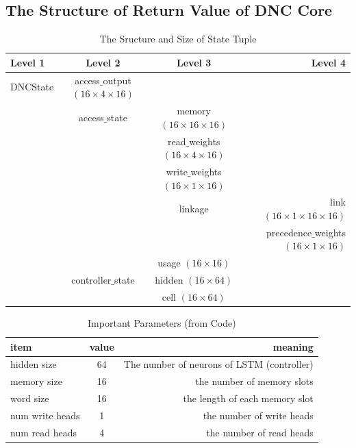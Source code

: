 \documentclass{article}
\begin{document}
\subsection{The Structure of Return Value of DNC Core}
\begin{table}[!htb]
\centering
\caption{The Sructure and Size of State Tuple}
\begin{tabular}{| l | c | c | r |} \hline
Level 1  & Level 2          & Level 3           & Level 4  \\ \hline
DNCState & access$\_$output $(16\times4\times16)$ &                   &   \\ \hline
         & access$\_$state  & memory $(16\times16\times16)$ &   \\ \hline
         &                  & read$\_$weights $(16\times4\times16)$ &   \\ \hline
         &                  & write$\_$weights $(16\times1\times16)$ &   \\ \hline
         &                  & linkage           & link $(16\times1\times16\times16)$ \\ \hline
         &                  &                   & precedence$\_$weights $(16\times1\times16)$ \\ \hline
         &                  & usage $(16\times16)$ & \\ \hline
         & controller$\_$state    & hidden $(16\times64)$ & \\ \hline
         &                  & cell $(16\times64)$ & \\ \hline
\end{tabular}
\label{tab:TupleStructureSize}
\end{table}

\begin{table}[!htb]
\centering
\caption{Important Parameters (from Code)}
\begin{tabular}{| l | c | r |} \hline
item        & value & meaning \\ \hline
hidden size & 64 & The number of neurons of LSTM (controller) \\ \hline
memory size & 16 & the number of memory slots \\ \hline
word size & 16 & the length of each memory slot \\ \hline
num write heads & 1 & the number of write heads \\ \hline
num read heads  & 4 & the number of read heads \\ \hline
\end{tabular}
\end{table}
\end{document}
